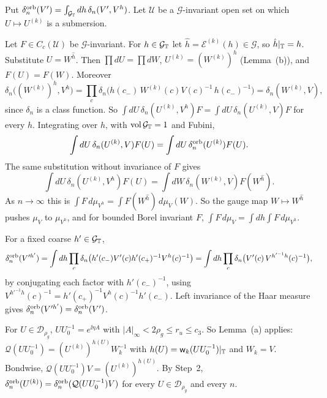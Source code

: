 \begin{detail}\label{d11a:E2}
Put $\delta^{\rm orb}_n(V')=\int_{\mathcal G_\mathbb T}dh\,\delta_n(V',V^h)$. Let $\mathcal U$ be a $\mathcal G$-invariant open set on which $U\mapsto U^{(k)}$ is a submersion.
\begin{step}
Let $F\in C_c(\mathcal U)$ be $\mathcal G$-invariant. For $h\in\mathcal G_\mathbb T$ let $\hat h=\mathcal E^{(k)}(h)\in\mathcal G$, so $\hat h|_\mathbb T=h$. Substitute $U=W^{\hat h}$. Then $\prod dU=\prod dW$, $U^{(k)}=(W^{(k)})^h$ (Lemma~(b)), and $F(U)=F(W)$. Moreover
\[
\delta_n\big((W^{(k)})^h,V^h\big)=\prod_c\delta_n\big(h(c_-)\,W^{(k)}(c)V(c)^{-1}\,h(c_-)^{-1}\big)=\delta_n(W^{(k)},V),
\]
since $\delta_n$ is a class function. So $\int dU\,\delta_n(U^{(k)},V^h)F=\int dU\,\delta_n(U^{(k)},V)F$ for every $h$. Integrating over $h$, with $\operatorname{vol}\mathcal G_\mathbb T=1$ and Fubini,
\[
\int dU\,\delta_n(U^{(k)},V)F(U)=\int dU\,\delta^{\rm orb}_n(U^{(k)})F(U).
\]
The same substitution without invariance of $F$ gives
\[
\int dU\,\delta_n(U^{(k)},V^h)F(U)=\int dW\,\delta_n(W^{(k)},V)F(W^{\hat h}).
\]
As $n\to\infty$ this is $\int F\,d\mu_{V^h}=\int F(W^{\hat h})\,d\mu_V(W)$. So the gauge map $W\mapsto W^{\hat h}$ pushes $\mu_V$ to $\mu_{V^h}$, and for bounded Borel invariant $F$, $\int F\,d\mu_V=\int dh\int F\,d\mu_{V^h}$.
\end{step}
\begin{step}
For a fixed coarse $h'\in\mathcal G_\mathbb T$,
\[
\delta^{\rm orb}_n(V'^{h'})=\int dh\prod_c\delta_n\big(h'(c_-)V'(c)h'(c_+)^{-1}V^h(c)^{-1}\big)=\int dh\prod_c\delta_n\big(V'(c)\,V^{h'^{-1}h}(c)^{-1}\big),
\]
by conjugating each factor with $h'(c_-)^{-1}$, using $V^{h'^{-1}h}(c)^{-1}=h'(c_+)^{-1}V^h(c)^{-1}h'(c_-)$. Left invariance of the Haar measure gives $\delta^{\rm orb}_n(V'^{h'})=\delta^{\rm orb}_n(V')$.
\end{step}
\begin{step}
For $U\in\mathcal D_{\rho_g}$, $UU_0^{-1}=e^{\ii\eta A}$ with $|A|_\infty<2\rho_g\le r_u\le c_3$. So Lemma~(a) applies: $\mathcal Q(UU_0^{-1})=(U^{(k)})^{h(U)}W_k^{-1}$ with $h(U)=\mathsf w_k(UU_0^{-1})|_\mathbb T$ and $W_k=V$. Bondwise, $\mathcal Q(UU_0^{-1})V=(U^{(k)})^{h(U)}$. By Step~2, $\delta^{\rm orb}_n(U^{(k)})=\delta^{\rm orb}_n(\mathcal Q(UU_0^{-1})V)$ for every $U\in\mathcal D_{\rho_g}$ and every $n$.
\end{step}
\end{detail}

